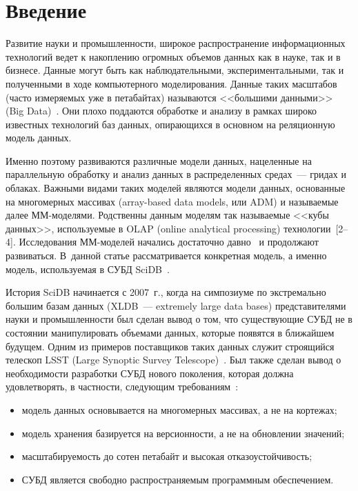       \begin{multicols}{2}

            \label{st\stat}
            

\section{Введение}

        Развитие науки и промышленности, широкое распространение 
информационных технологий ведет к накоплению огромных объемов данных 
как в науке, так и в бизнесе. Данные могут быть как наблюдательными, 
экспериментальными, так и полученными в ходе компьютерного 
моделирования. Данные таких масштабов (часто измеряемых уже в петабайтах) 
называются <<большими данными>> (Big Data)~\cite{1-stu}. Они плохо 
поддаются обработке и анализу в рамках широко известных технологий баз 
данных, опирающихся в основном на реляционную модель данных.
        
        Именно поэтому развиваются различные модели данных, нацеленные на 
параллельную обработку и анализ данных в распределенных средах~--- гридах 
и облаках. Важными видами таких моделей являются модели данных, 
основанные на многомерных массивах (array-based data models, или ADM) 
и называемые далее ММ-мо\-де\-ля\-ми. Родственны данным моделям 
так называемые <<кубы данных>>, используемые в 
OLAP (online analytical processing) тех\-но\-ло\-гии~[2--4]. 
Исследования ММ-мо\-де\-лей начались достаточно 
давно~\cite{4-stu, 5-stu} и продолжают развиваться. В~данной статье 
рассматривается конкретная модель, а именно модель, используемая в СУБД 
SciDB~\cite{6-stu}.
        
        История SciDB начинается с 2007~г., когда на симпозиуме по 
экстремально большим базам данных (XLDB~--- extremely large data bases) 
представителями науки и 
промышленности был сделан вывод о том, что существующие СУБД не в 
состоянии манипулировать объемами данных, которые появятся в ближайшем 
будущем. Одним из примеров поставщиков таких данных служит строящийся 
телескоп LSST (Large Synoptic Survey Telescope)~\cite{7-stu}. Был также сделан 
вывод о необходимости разработки СУБД нового поколения, которая должна 
удовлетворять, в частности, следующим требованиям~\cite{8-stu}:
        \begin{itemize}
\item модель данных основывается на многомерных массивах, а не на 
кортежах;
\item модель хранения базируется на версионности, а не на обновлении 
значений;
\item масштабируемость до сотен петабайт и высокая отказоустойчивость;
\item СУБД является свободно распространяемым программным 
обеспечением.
\end{itemize}


\end{multicols}
